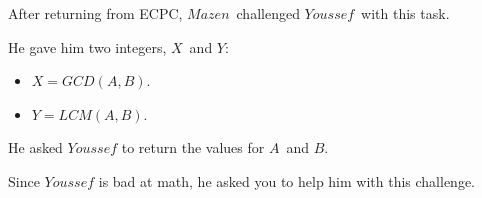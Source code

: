 After returning from ECPC, $Mazen$ challenged $Youssef$ with this task.

He gave him two integers, $X$ and $Y$:
\begin{itemize}
  \item $X = GCD(A,B)$.
  \item $Y = LCM(A,B)$.
\end{itemize}

He asked $Youssef$ to return the values for $A$ and $B$.

Since $Youssef$ is bad at math, he asked you to help him with this challenge.

